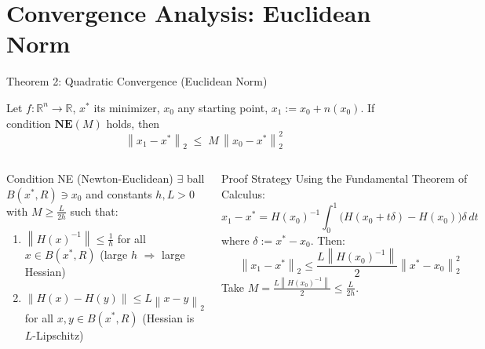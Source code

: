 \documentclass[aspectratio=169,10pt]{beamer}
\newcommand{\R}{\mathbb{R}}
\newcommand{\norm}[1]{\left\|#1\right\|}
\begin{document}
\section{Convergence Analysis: Euclidean Norm}

\begin{frame}{Theorem 2: Quadratic Convergence (Euclidean Norm)}
  \begin{theorem}
    Let $f:\R^n\to\R$, $x^*$ its minimizer, $x_0$ any starting point,
    $x_1:=x_0+n(x_0)$.
    If condition $\mathbf{NE}(M)$ holds, then
    \[
      \norm{x_1-x^*}_2 \;\le\; M\,\norm{x_0-x^*}_2^2
    \]
  \end{theorem}

  \begin{columns}[T]
      \begin{block}{Condition NE (Newton-Euclidean)}
        $\exists$ ball $B(x^*,R)\ni x_0$ and constants $h,L>0$
        with $M\ge\frac{L}{2h}$ such that:
        \begin{enumerate}
          \item $\norm{H(x)^{-1}}\le\frac{1}{h}$
                for all $x\in B(x^*,R)$
                \hfill(large $h$ $\Rightarrow$ large Hessian)
          \item $\norm{H(x)-H(y)}\le L\norm{x-y}_2$
                for all $x,y\in B(x^*,R)$
                \hfill(Hessian is $L$-Lipschitz)
        \end{enumerate}
      \end{block}

      \begin{block}{Proof Strategy}
        Using the Fundamental Theorem of Calculus:
        \[
          x_1-x^* = H(x_0)^{-1}\!\int_0^1\!\!
            \bigl(H(x_0\!+\!t\delta)-H(x_0)\bigr)\delta\,dt
        \]
        where $\delta:=x^*-x_0$.  Then:
        \[
          \norm{x_1-x^*}_2
          \le \frac{L\norm{H(x_0)^{-1}}}{2}\norm{x^*-x_0}_2^2
        \]
        Take $M = \frac{L\norm{H(x_0)^{-1}}}{2} \le \frac{L}{2h}$.
      \end{block}
  \end{columns}
\end{frame}
\end{document}
